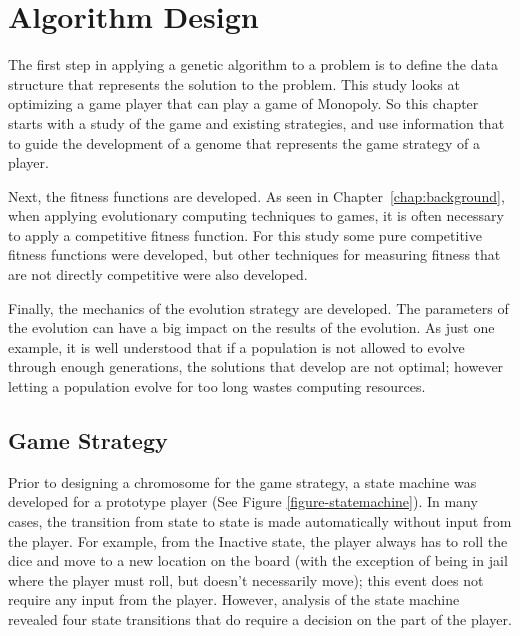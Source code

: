 \clearpage
\chapter{Algorithm Design} \label{chap:algorithm}

The first step in applying a genetic algorithm to a problem is to define the
data structure that represents the solution to the problem. This study looks at
optimizing a game player that can play a game of Monopoly. So this chapter
starts with a study of the game and existing strategies, and use information
that to guide the development of a genome that represents the game strategy of a
player.

Next, the fitness functions are developed. As seen in
Chapter~\ref{chap:background}, when applying evolutionary computing techniques
to games, it is often necessary to apply a competitive fitness function. For
this study some pure competitive fitness functions were developed, but other
techniques for measuring fitness that are not directly competitive were also
developed.

Finally, the mechanics of the evolution strategy are developed. The parameters
of the evolution can have a big impact on the results of the evolution. As just
one example, it is well understood that if a population is not allowed to evolve
through enough generations, the solutions that develop are not optimal; however
letting a population evolve for too long wastes computing resources.

\section{Game Strategy} \label{5_strategy}

Prior to designing a chromosome for the game strategy, a state machine was
developed for a prototype player (See Figure \ref{figure-statemachine}). In many
cases, the transition from state to state is made automatically without input
from the player. For example, from the Inactive state, the player always has to
roll the dice and move to a new location on the board (with the exception of
being in jail where the player must roll, but doesn't necessarily move); this
event does not require any input from the player. However, analysis of the state
machine revealed four state transitions that do require a decision on the part
of the player.

